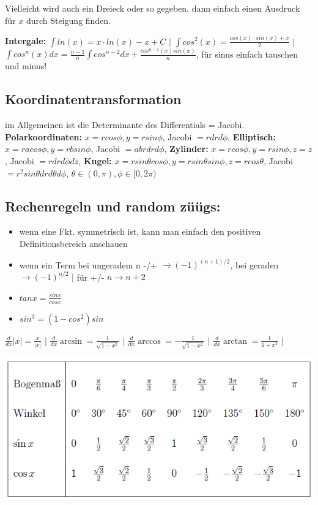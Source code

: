 \documentclass[a3paper, ngerman, 8pt]{article}
\begin{document}
\begin{multicols*}{3}
Vielleicht wird auch ein Dreieck oder so gegeben, dann einfach einen Ausdruck für $x$ durch Steigung finden. 

\textbf{Intergale:} $\int ln(x)=x\cdot ln(x) - x + C$ $\big \vert$ $\int cos^2(x)=\frac{cos(x)\cdot sin(x) + x}{2}$ $\big \vert$ $\int cos^n(x)dx=\frac{n-1}{n}\int cos^{n-2}dx+\frac{cos^{n-1}(x)sin(x)}{n}$, für sinus einfach tauschen und minus!

\subsection*{Koordinatentransformation}
im Allgemeinen ist die Determinante des Differentials = Jacobi. 
\textbf{Polarkoordinaten: } $x= rcos\phi, y=rsin\phi$, Jacobi $=rdrd\phi$, 
\textbf{Elliptisch:} $x=racos\phi, y = rbsin\phi$, Jacobi $=abrdrd\phi$, \textbf{Zylinder:} $x=rcos\phi, y=rsin\phi, z=z$, Jacobi $=rdrd\phi dz$, \textbf{Kugel:} $x=rsin\theta cos\phi, y=rsin\theta sin\phi, z=rcos\theta$, Jacobi $=r^2sin\theta drd\theta d\phi$, $\theta \in (0,\pi), \phi \in [0,2\pi)$

\subsection*{Rechenregeln und random züügs:} 
\begin{itemize}
	\item wenn eine Fkt. symmetrisch ist, kann man einfach den positiven Definitionsbereich anschauen
	\item wenn ein Term bei ungeradem n -/+ $\to (-1)^{(n+1)/2}$, bei geraden $\to (-1)^{n/2}$ $ \big \vert$ für +/- $n \to n+2$
	\item $tanx = \frac{sinx}{cosx}$
	\item $sin^3=(1-cos^2)sin$
\end{itemize}

$\frac{d}{dx} |x| = \frac{x}{|x|}$ $\big \vert$ $\frac{d}{dx} \arcsin = \frac{1}{\sqrt{1-x^2}}$ $\big \vert$ $\frac{d}{dx} \arccos = -\frac{1}{\sqrt{1-x^2}}$ $\big \vert$ $\frac{d}{dx} \arctan = \frac{1}{1+x^2}$ $\big \vert$

\includegraphics[width=1\linewidth]{winkel.png}





\end{multicols*}
\end{document}
